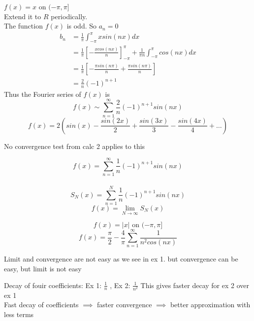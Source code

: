 \documentclass[answers,12pt,addpoints]{exam}
\begin{document}
\begin{example}
    $f(x) = x$ on $(-\pi, \pi]$\\
    Extend it to $R$ periodically.\\
    The function $f(x)$ is odd. So $a_n = 0$\\
    \begin{align*}
        b_n &= \frac{1}{\pi} \int_{-\pi}^{\pi} x sin(nx) dx\\
        &= \frac{1}{\pi} \left[ -\frac{x cos(nx)}{n} \right]_{-\pi}^{\pi} + \frac{1}{\pi n} \int_{-\pi}^{\pi} cos(nx) dx\\
        &= \frac{1}{\pi} \left[ -\frac{\pi sin(n\pi)}{n} + \frac{\pi sin(n\pi)}{n} \right]\\
        &= \frac{2}{n} (-1)^{n+1}
    \end{align*}
    Thus the Fourier series of $f(x)$ is
    $$ f(x) \sim \sum_{n=1}^{\infty} \frac{2}{n} (-1)^{n+1} sin(nx)$$
    $$ f(x) = 2(sin(x) - \frac{sin(2x)}{2} + \frac{sin(3x)}{3} - \frac{sin(4x)}{4} + \ldots)$$
    \begin{note}
        No convergence test from calc 2 applies to this
    \end{note}
    $$f(x) = \sum_{n=1}^{\infty} \frac{1}{n} (-1)^{n+1} sin(nx)$$\\ 
    $$ S_N(x) = \sum_{n=1}^{N} \frac{1}{n} (-1)^{n+1} sin(nx)$$
    $$ f(x) = \lim_{N \to \infty} S_N(x)$$
\end{example}
\begin{example}
    $$f(x) = |x| \text{ on } (-\pi, \pi]$$
    $$f(x) = \frac{\pi}{2} - \frac{4}{\pi} \sum_{n=1}^{\infty} \frac{1}{n^2 cos(nx)}$$
\end{example}
\begin{remark}
    Limit and convergence are not easy as we see in ex 1. but convergence can be easy, but limit is not easy 
\end{remark}
\begin{remark}
    Decay of fouir coefficients: Ex 1: $\frac{1}{n}$ , Ex 2: $\frac{1}{n^2}$
    This gives faster decay for ex 2 over ex 1\\
    Fast decay of coefficients $\implies$ faster convergence $\implies$ better approximation with less terms
\end{remark}
\end{document}
